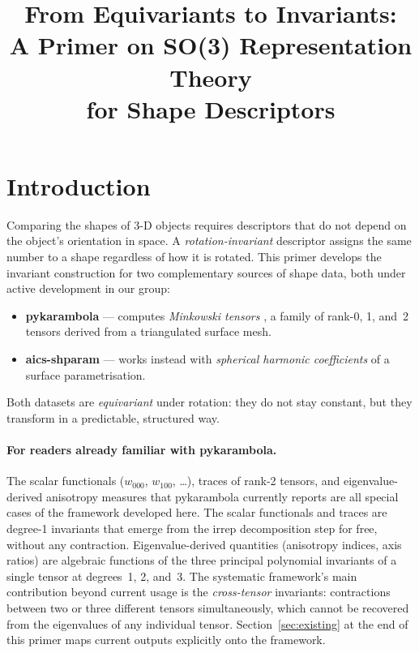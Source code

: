 \documentclass[11pt,a4paper]{article}
\title{From Equivariants to Invariants:\\
       A Primer on SO(3) Representation Theory\\
       for Shape Descriptors}
\date{}
\begin{document}
\maketitle
\tableofcontents
\bigskip

\section{Introduction}
\label{sec:intro}

Comparing the shapes of 3-D objects requires descriptors that do not depend on
the object's orientation in space.
A \emph{rotation-invariant} descriptor assigns the same number to a shape
regardless of how it is rotated.
This primer develops the invariant construction for two complementary sources
of shape data, both under active development in our group:

\begin{itemize}
  \item \textbf{pykarambola} — computes \emph{Minkowski tensors}
        \cite{SchroderTurk2013,HugSchneider2017}, a family of rank-0, 1, and~2
        tensors derived from a triangulated surface mesh.
  \item \textbf{aics-shparam} — works instead with \emph{spherical harmonic
        coefficients} of a surface parametrisation.
\end{itemize}

Both datasets are \emph{equivariant} under rotation: they do not stay constant,
but they transform in a predictable, structured way.

\paragraph{For readers already familiar with pykarambola.}
The scalar functionals ($w_{000}$, $w_{100}$, \ldots), traces of rank-2 tensors,
and eigenvalue-derived anisotropy measures that pykarambola currently reports are
all special cases of the framework developed here.
The scalar functionals and traces are degree-1 invariants that emerge from the
irrep decomposition step for free, without any contraction.
Eigenvalue-derived quantities (anisotropy indices, axis ratios) are algebraic
functions of the three principal polynomial invariants of a single tensor at
degrees~1, 2, and~3.
The systematic framework's main contribution beyond current usage is the
\emph{cross-tensor} invariants: contractions between two or three different
tensors simultaneously, which cannot be recovered from the eigenvalues of any
individual tensor.
Section~\ref{sec:existing} at the end of this primer maps current outputs
explicitly onto the framework.
\end{document}
